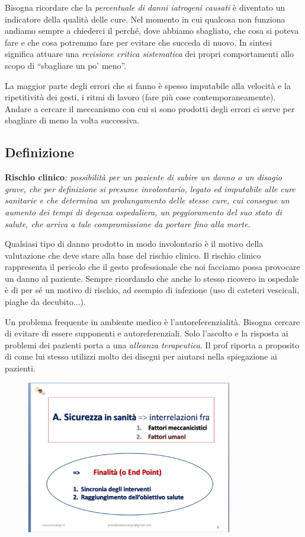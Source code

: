 Bisogna ricordare che la \emph{percentuale di danni iatrogeni causati} è
diventato un indicatore della qualità delle cure. Nel momento in cui
qualcosa non funziona andiamo sempre a chiederci il perché, dove abbiamo
sbagliato, che cosa si poteva fare e che cosa potremmo fare per evitare
che succeda di nuovo. In sintesi significa attuare una \emph{revisione
critica sistematica} dei propri comportamenti allo scopo di ``sbagliare
un po' meno''.

La maggior parte degli errori che si fanno è spesso imputabile alla
velocità e la ripetitività dei gesti, i ritmi di lavoro (fare più cose
contemporaneamente). Andare a cercare il meccanismo con cui si sono
prodotti degli errori ci serve per sbagliare di meno la volta
successiva.

\subsection{Definizione}

\textbf{Rischio clinico}\emph{: possibilità per un paziente di subire un
danno o un disagio grave, che per definizione si presume involontario,
legato ed imputabile alle cure sanitarie e che determina un
prolungamento delle stesse cure, cui consegue un aumento dei tempi di
degenza ospedaliera, un peggioramento del suo stato di salute, che
arriva a tale compromissione da portare fino alla morte.}

Qualsiasi tipo di danno prodotto in modo involontario è il motivo della
valutazione che deve stare alla base del rischio clinico. Il rischio
clinico rappresenta il pericolo che il gesto professionale che noi
facciamo possa provocare un danno al paziente. Sempre ricordando che
anche lo stesso ricovero in ospedale è di per sé un motivo di rischio,
ad esempio di infezione (uso di cateteri vescicali, piaghe da
decubito...).

Un problema frequente in ambiente medico è l'autoreferenzialità. Bisogna
cercare di evitare di essere supponenti e autoreferenziali. Solo
l'ascolto e la risposta ai problemi dei pazienti porta a una
\emph{alleanza terapeutica}. Il prof riporta a proposito di come lui
stesso utilizzi molto dei disegni per aiutarsi nella spiegazione ai
pazienti.

\begin{figure}[!ht]
\centering
	\includegraphics[width=0.8\textwidth]{30/image1.png}
	\end{figure}

